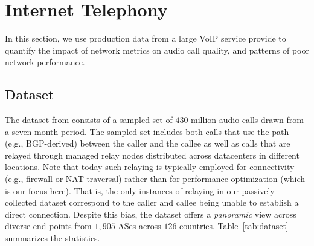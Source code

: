 \section{Internet Telephony}
\label{sec:measurement:voip}


In this section, we use production data from a large VoIP service 
provide \skype to quantify the impact of network metrics on 
audio call quality, and patterns of poor network performance. 

\subsection{Dataset}
\label{subsec:measurement:voip:dataset}

The dataset from \skype consists of a sampled set of $430$ 
million audio calls drawn from a seven month period. 
The sampled set includes both calls that use the 
\direct path (e.g., BGP-derived) between the caller 
and the callee %
as well as calls that are relayed through managed 
relay nodes distributed across datacenters in different 
locations. %
Note that today such relaying is typically employed for 
connectivity (e.g., firewall or NAT traversal) rather than 
for performance optimization (which is our focus here).
That is, the only instances of relaying in our passively 
collected dataset correspond to the caller and callee being 
unable to establish a direct connection. 
Despite this bias, the dataset offers a {\em panoramic} view 
across diverse end-points from $1,905$ ASes across $126$ 
countries. Table~\ref{tab:dataset} summarizes the statistics.


